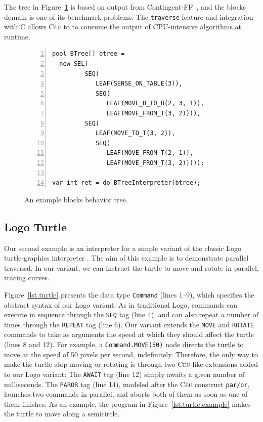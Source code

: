 \documentclass{sig-alternate}
\newcommand{\CEU}{\textsc{C\'{e}u}\xspace}
\newcommand{\code}[1] {{\small{\texttt{#1}}}}
\begin{document}
The tree in Figure~\ref{lst.bt1.example} is based on output from Contingent-FF~\cite{hoffmann2005contingent},
and the blocks domain is one of its benchmark problems.
The \code{traverse} feature and integration with C allows \CEU to
to consume the output of CPU-intensive algorithms at runtime.

\begin{figure}[t]
\begin{lstlisting}[numbers=left,xleftmargin=3em]
pool BTree[] btree =
  new SEL(
         SEQ(
            LEAF(SENSE_ON_TABLE(3)),
            SEQ(
               LEAF(MOVE_B_TO_B(2, 3, 1)),
               LEAF(MOVE_FROM_T(3, 2)))),
         SEQ(
            LEAF(MOVE_TO_T(3, 2)),
            SEQ(
               LEAF(MOVE_FROM_T(2, 1)),
               LEAF(MOVE_FROM_T(3, 2)))));

var int ret = do BTreeInterpreter(btree);
\end{lstlisting}
\caption{ An example blocks behavior tree.
\label{lst.bt1.example}
}
\end{figure}

\subsection{Logo Turtle}

Our second example is an interpreter for a simple variant of the classic Logo
turtle-graphics interpreter \cite{papert.logo}.
The aim of this example is to demonstrate parallel traversal.
In our variant, we can instruct the turtle to move and rotate in parallel, 
tracing curves.


Figure~\ref{lst.turtle} presents the data type \code{Command} (lines 1--9), 
which specifies the abstract syntax of our Logo variant.
As in traditional Logo, commands can execute in sequence through the \code{SEQ} 
tag (line 4), and can also repeat a number of times through the \code{REPEAT} 
tag (line 6).
%
Our variant extends the \code{MOVE} and \code{ROTATE} commands to take as 
arguments the speed at which they should affect the turtle (lines 8 and 12).
For example, a \code{Command.MOVE(50)} node directs the turtle to move at the 
speed of 50 pixels per second, indefinitely.
%
Therefore, the only way to make the turtle stop moving or rotating is through 
two \CEU-like extensions added to our Logo variant:
The \code{AWAIT} tag (line 12) simply awaits a given number of milliseconds.
The \code{PAROR} tag (line 14), modeled after the \CEU construct \code{par/or},
launches two commands in parallel, and aborts both of them as soon as one of
them finishes.
%
As an example, the program in Figure~\ref{lst.turtle.example} makes the turtle 
to move along a semicircle.
\end{document}
